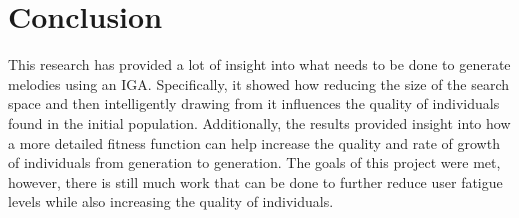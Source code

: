\documentclass[12pt]{article} %
\begin{document}
\section{Conclusion} 
This research has provided a lot of insight into what needs to be done to generate melodies using an IGA. Specifically, it showed how reducing the size of the search space and then intelligently drawing from it influences the quality of individuals found in the initial population. Additionally, the results provided insight into how a more detailed fitness function can help increase the quality and rate of growth of individuals from generation to generation. The goals of this project were met, however, there is still much work that can be done to further reduce user fatigue levels while also increasing the quality of individuals.  \\

%
%




\end{document}
